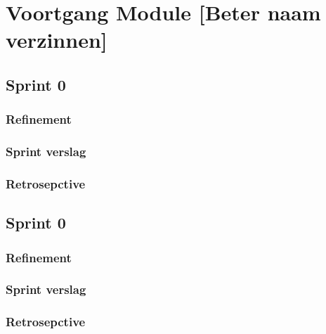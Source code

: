 
\chapter{Voortgang Module [Beter naam verzinnen]}

\section{Sprint 0}
\lipsum[01]
\subsection{Refinement}
\lipsum[01]
\subsection{Sprint verslag}
\lipsum[01]
\subsection{Retrosepctive}
\lipsum[01]

\section{Sprint 0}
\lipsum[01]
\subsection{Refinement}
\lipsum[01]
\subsection{Sprint verslag}
\lipsum[01]
\subsection{Retrosepctive}
